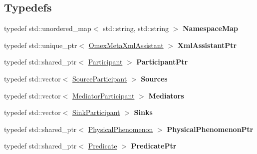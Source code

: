 \subsection*{Typedefs}
\begin{DoxyCompactItemize}
\item 
\mbox{\label{namespaceomexmeta_ad9c3f36d18cb218950d2780f2d4dc0a0}} 
typedef std\+::unordered\+\_\+map$<$ std\+::string, std\+::string $>$ {\bfseries Namespace\+Map}
\item 
\mbox{\label{namespaceomexmeta_a602c5d1094d065496b79af07e9a3b28a}} 
typedef std\+::unique\+\_\+ptr$<$ \hyperlink{classomexmeta_1_1OmexMetaXmlAssistant}{Omex\+Meta\+Xml\+Assistant} $>$ {\bfseries Xml\+Assistant\+Ptr}
\item 
\mbox{\label{namespaceomexmeta_a90b8619f565d06ee3a8fa4d1cfda893c}} 
typedef std\+::shared\+\_\+ptr$<$ \hyperlink{classomexmeta_1_1Participant}{Participant} $>$ {\bfseries Participant\+Ptr}
\item 
\mbox{\label{namespaceomexmeta_a1c258e53336c37fdc17cf08a394f5198}} 
typedef std\+::vector$<$ \hyperlink{classomexmeta_1_1SourceParticipant}{Source\+Participant} $>$ {\bfseries Sources}
\item 
\mbox{\label{namespaceomexmeta_ac2d6392fea1506f1d5d13ebb155db3df}} 
typedef std\+::vector$<$ \hyperlink{classomexmeta_1_1MediatorParticipant}{Mediator\+Participant} $>$ {\bfseries Mediators}
\item 
\mbox{\label{namespaceomexmeta_a57d60796797e34581e3c1780985f0b59}} 
typedef std\+::vector$<$ \hyperlink{classomexmeta_1_1SinkParticipant}{Sink\+Participant} $>$ {\bfseries Sinks}
\item 
\mbox{\label{namespaceomexmeta_aeb3054fca8bdfaeeae91c2f3e1bd8c27}} 
typedef std\+::shared\+\_\+ptr$<$ \hyperlink{classomexmeta_1_1PhysicalPhenomenon}{Physical\+Phenomenon} $>$ {\bfseries Physical\+Phenomenon\+Ptr}
\item 
\mbox{\label{namespaceomexmeta_a2edd0078a7f3b226df6fb3382d76471a}} 
typedef std\+::shared\+\_\+ptr$<$ \hyperlink{classomexmeta_1_1Predicate}{Predicate} $>$ {\bfseries Predicate\+Ptr}

\end{DoxyCompactItemize}
